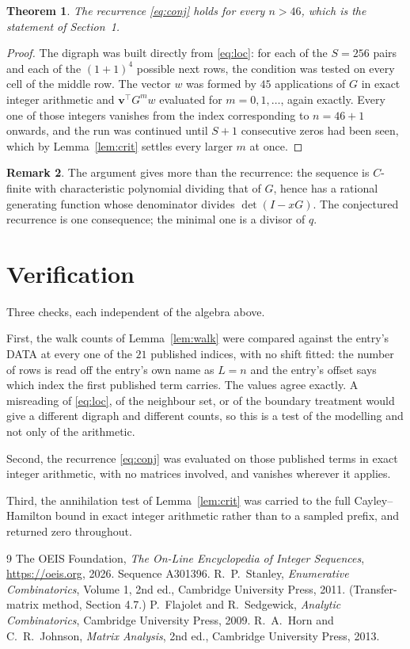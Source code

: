 \documentclass[11pt,a4paper]{article}
\theoremstyle{plain}
\newtheorem{theorem}{Theorem}
\theoremstyle{definition}
\newtheorem{remark}[theorem]{Remark}
\begin{document}
\begin{theorem}
The recurrence \eqref{eq:conj} holds for every $n>46$, which is the statement of
Section~1.
\end{theorem}

\begin{proof}
The digraph was built directly from \eqref{eq:loc}: for each of the $S=256$ pairs and each
of the $(1+1)^{4}$ possible next rows, the condition was tested on every cell of
the middle row. The vector $w$ was formed by $45$ applications of $G$ in exact integer
arithmetic and $\mathbf{v}^{\!\top}G^{m}w$ evaluated for $m=0,1,\dots$, again exactly.
Every one of those integers vanishes from the index corresponding to $n=46+1$ onwards,
and the run was continued until $S+1$ consecutive zeros had been seen, which by
Lemma~\ref{lem:crit} settles every larger $m$ at once.
\end{proof}

\begin{remark}
The argument gives more than the recurrence: the sequence is $C$-finite with characteristic
polynomial dividing that of $G$, hence has a rational generating function whose denominator
divides $\det(I-xG)$. The conjectured recurrence is one consequence; the minimal one is a
divisor of $q$.
\end{remark}

\section{Verification}

Three checks, each independent of the algebra above.

First, the walk counts of Lemma~\ref{lem:walk} were compared against the entry's DATA at
every one of the $21$ published indices, with no shift fitted: the number of rows is
read off the entry's own name as $L=n$ and the entry's offset says which index the first
published term carries. The values agree exactly. A misreading of \eqref{eq:loc}, of the
neighbour set, or of the boundary treatment would give a different digraph and different
counts, so this is a test of the modelling and not only of the arithmetic.

Second, the recurrence \eqref{eq:conj} was evaluated on those published terms in exact
integer arithmetic, with no matrices involved, and vanishes wherever it applies.

Third, the annihilation test of Lemma~\ref{lem:crit} was carried to the full
Cayley--Hamilton bound in exact integer arithmetic rather than to a sampled prefix, and
returned zero throughout.

\begin{thebibliography}{9}
 The OEIS Foundation, \emph{The On-Line Encyclopedia of Integer
Sequences}, \url{https://oeis.org}, 2026. Sequence A301396.
 R.~P.~Stanley, \emph{Enumerative Combinatorics}, Volume 1, 2nd ed.,
Cambridge University Press, 2011. (Transfer-matrix method, Section 4.7.)
 P.~Flajolet and R.~Sedgewick, \emph{Analytic Combinatorics}, Cambridge
University Press, 2009.
 R.~A.~Horn and C.~R.~Johnson, \emph{Matrix Analysis}, 2nd ed., Cambridge
University Press, 2013.
\end{thebibliography}
\end{document}
